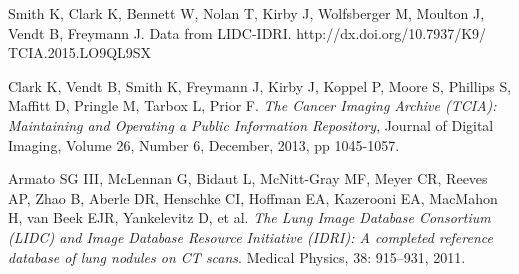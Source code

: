 \documentclass[12pt]{report}
\begin{document}
\begin{thebibliography}{9}
	Smith K, Clark K, Bennett W, Nolan T, Kirby J, Wolfsberger M, Moulton J, Vendt B, Freymann J.  Data from LIDC-IDRI.  http://dx.doi.org/10.7937/K9/		TCIA.2015.LO9QL9SX
	
	Clark K, Vendt B, Smith K, Freymann J, Kirby J, Koppel P, Moore S, Phillips S, Maffitt D, Pringle M, Tarbox L, Prior F.
	 \emph{The Cancer Imaging Archive (TCIA): Maintaining and Operating a Public Information Repository}, 
	 Journal of Digital Imaging, Volume 26, Number 6, December, 2013, pp 1045-1057.
	 
	Armato SG III, McLennan G, Bidaut L, McNitt-Gray MF, Meyer CR, Reeves AP, Zhao B, Aberle DR, Henschke CI, Hoffman EA, Kazerooni EA,
	MacMahon H, van Beek EJR, Yankelevitz D, et al.  
	\emph{The Lung Image Database Consortium (LIDC) and Image Database Resource Initiative (IDRI): A completed reference database of lung
	nodules on CT scans}.
	Medical Physics, 
	38: 915--931, 2011.
\end{thebibliography}
\end{document}
